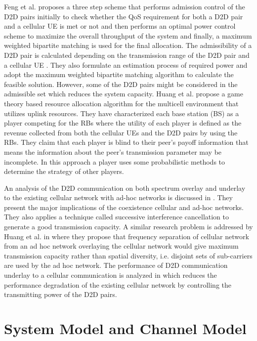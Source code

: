 \documentclass[times]{dacauth}
\begin{document}
\smallskip
\noindent
Feng et al. \cite{feng} proposes a three step scheme that performs admission control of the D2D pairs initially to check whether the QoS requirement for both a D2D pair and a cellular UE is met or not and then performs an optimal power control scheme to maximize the overall throughput of the system and finally, a maximum weighted bipartite matching is used for the final allocation. The admissibility of a D2D pair is calculated depending on the transmission range of the D2D pair and a cellular UE . They also formulate an estimation process of required power and adopt the maximum weighted bipartite matching algorithm to calculate the feasible solution. However, some of the D2D pairs might be considered in the admissible set which reduces the system capacity. Huang et al. \cite{huang_game} propose a game theory based resource allocation algorithm for the multicell environment that utilizes uplink resources. They have characterized each base station (BS) as a player competing for the RBs where the utility of each player is defined as the revenue collected from both the cellular UEs and the D2D pairs by using the RBs. They claim that each player is blind to their peer's payoff information that means the information about the peer's transmission parameter may be incomplete. In this approach a player uses some probabilistic methods to determine the strategy of other players.

\smallskip
\noindent
An analysis of the D2D communication on both spectrum overlay and underlay to the existing cellular network with ad-hoc networks is discussed in \cite{huang}. They present the major implications of the coexistence cellular and ad-hoc networks. They also applies a technique called successive interference cancellation to generate a good transmission capacity. A similar research problem is addressed by Huang et al. in \cite{overlaid} where they propose that frequency separation of cellular network from an ad hoc network overlaying the cellular network would give maximum transmission capacity rather than spatial diversity, i.e. disjoint sets of sub-carriers are used by the ad hoc network. The performance of D2D communication underlay to a cellular communication is analyzed in \cite{yu} which reduces the performance degradation of the existing cellular network by controlling the transmitting power of the D2D pairs. 



\section{System Model and Channel Model}\label{section:System and Channel Model}
\vspace {-0.3cm}
\end{document}

